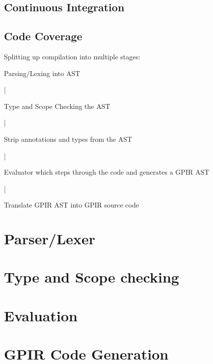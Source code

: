 \subsection{Continuous Integration}
\subsection{Code Coverage}


Splitting up compilation into multiple stages:
    
    Parsing/Lexing into AST

         |

     Type and Scope Checking the AST

         |

     Strip annotations and types from the AST

        |

     Evaluator which steps through the code and generates a 
     GPIR AST

        |

      Translate GPIR AST into GPIR source code

\section{Parser/Lexer}
\section{Type and Scope checking}
\section{Evaluation}
\section{GPIR Code Generation}
